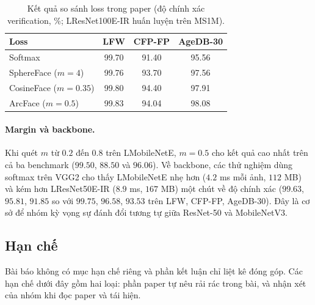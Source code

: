 \documentclass[a4paper,12pt]{article}
\begin{document}
\begin{table}[h]
    \centering
    \caption{Kết quả so sánh loss trong paper (độ chính xác verification, \%; LResNet100E-IR huấn luyện trên MS1M).}
    \label{tab:paper-loss}
    \begin{tabular}{lccc}
        \toprule
        Loss                  & LFW   & CFP-FP & AgeDB-30 \\
        \midrule
        Softmax               & 99.70 & 91.40  & 95.56    \\
        SphereFace ($m=4$)    & 99.76 & 93.70  & 97.56    \\
        CosineFace ($m=0.35$) & 99.80 & 94.40  & 97.91    \\
        ArcFace ($m=0.5$)     & 99.83 & 94.04  & 98.08    \\
        \bottomrule
    \end{tabular}
\end{table}

\paragraph{Margin và backbone.} Khi quét $m$ từ $0.2$ đến $0.8$ trên LMobileNetE, $m = 0.5$ cho kết quả cao nhất trên cả ba benchmark ($99.50$, $88.50$ và $96.06$). Về backbone, các thử nghiệm dùng softmax trên VGG2 cho thấy LMobileNetE nhẹ hơn ($4.2$ ms mỗi ảnh, $112$ MB) và kém hơn LResNet50E-IR ($8.9$ ms, $167$ MB) một chút về độ chính xác ($99.63$, $95.81$, $91.85$ so với $99.75$, $96.58$, $93.53$ trên LFW, CFP-FP, AgeDB-30). Đây là cơ sở để nhóm kỳ vọng sự đánh đổi tương tự giữa ResNet-50 và MobileNetV3.

\subsection{Hạn chế}
Bài báo không có mục hạn chế riêng và phần kết luận chỉ liệt kê đóng góp. Các hạn chế dưới đây gồm hai loại: phần paper tự nêu rải rác trong bài, và nhận xét của nhóm khi đọc paper và tái hiện.
\end{document}
